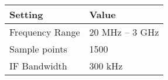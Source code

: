 \documentclass{article}
\begin{document}
\begin{center}
\renewcommand{\arraystretch}{1.4}
\setlength\arrayrulewidth{1.5pt}\begin{tabular}{|l| l|}
\rowcolor{gray!30!white} \hline
Setting & Value\\\hline
Frequency Range & 20 MHz -- 3 GHz\\\hline
Sample points & 1500\\\hline
IF Bandwidth & 300 kHz\\\hline
\end{tabular}
\end{center}
\end{document}
